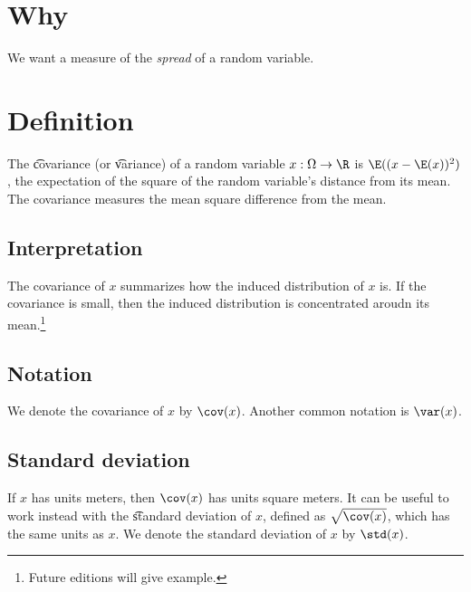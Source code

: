 

\section*{Why}

We want a measure of the \textit{spread} of a random variable.

\section*{Definition}

The \t{covariance} (or \t{variance}) of a random variable $x: \Omega  \to \R $ is $\E ((x - \E (x))^2)$, the expectation of the square of the random variable's distance from its mean.
The covariance measures the mean square difference from the mean.

\subsection*{Interpretation}

The covariance of $x$ summarizes how  the induced distribution of $x$ is.
If the covariance is small, then the induced distribution is concentrated aroudn its mean.\footnote{Future editions will give example.}

\subsection*{Notation}

We denote the covariance of $x$ by $\cov(x)$.
Another common notation is $\var(x)$.

\subsection*{Standard deviation}

If $x$ has units meters, then $\cov(x)$ has units square meters.
It can be useful to work instead with the \t{standard deviation} of $x$, defined as $\sqrt{\cov(x)}$, which has the same units as $x$.
We denote the standard deviation of $x$ by $\std(x)$.

\blankpage
